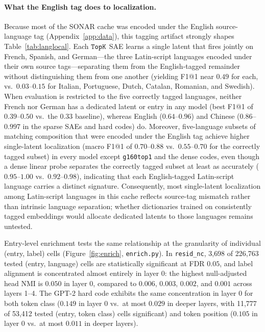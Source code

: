 \paragraph{What the English tag does to localization.} Because most of
the SONAR cache was encoded under the English source-language tag
(Appendix~\ref{app:data}), this tagging artifact strongly shapes
Table~\ref{tab:langlocal}. Each $\mathop{\mathtt{TopK}}\limits$ SAE learns a single latent that
fires jointly on French, Spanish, and German---the three Latin-script
languages encoded under their own source tags---separating them from the
English-tagged remainder without distinguishing them from one another
(yielding F1@1 near $0.49$ for each, vs.\ $0.03$--$0.15$ for Italian,
Portuguese, Dutch, Catalan, Romanian, and Swedish). When evaluation is
restricted to the five correctly tagged languages, neither French nor
German has a dedicated latent or entry in any model (best F1@1 of
$0.39$--$0.50$ vs.\ the $0.33$ baseline), whereas English ($0.64$--$0.96$)
and Chinese ($0.86$--$0.997$ in the sparse SAEs and hard codes) do.
Moreover, five-language subsets of matching composition that were encoded
under the English tag achieve higher single-latent localization (macro
F1@1 of $0.70$--$0.88$ vs.\ $0.55$--$0.70$ for the correctly tagged
subset) in every model except \texttt{g160top1} and the dense codes, even
though a dense linear probe separates the correctly tagged subset at
least as accurately ($0.95$--$1.00$ vs.\ $0.92$--$0.98$), indicating that
each English-tagged Latin-script language carries a distinct signature.
Consequently, most single-latent localization among Latin-script
languages in this cache reflects source-tag mismatch rather than
intrinsic language separation; whether dictionaries trained on
consistently tagged embeddings would allocate dedicated latents to those
languages remains untested.

Entry-level enrichment tests the same relationship at the granularity of
individual (entry, label) cells (Figure~\ref{fig:enrich},
\texttt{enrich.py}). In \texttt{resid\_nc}, 3{,}698 of 226{,}763 tested
(entry, language) cells are statistically significant at FDR $0.05$, and
label alignment is concentrated almost entirely in layer 0: the highest
null-adjusted head NMI is $0.050$ in layer 0, compared to $0.006$,
$0.003$, $0.002$, and $0.001$ across layers 1--4. The GPT-2 hard code
exhibits the same concentration in layer 0 for both token class ($0.149$
in layer 0 vs.\ at most $0.029$ in deeper layers, with 11{,}777 of
53{,}412 tested (entry, token class) cells significant) and token
position ($0.105$ in layer 0 vs.\ at most $0.011$ in deeper layers).

